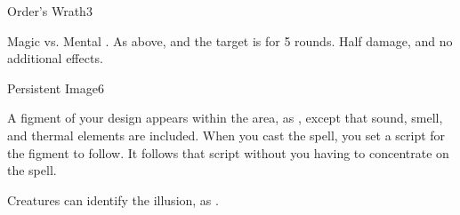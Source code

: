 
\begin{spellsection}{Order's Wrath}{3}
    \begin{spellheader}
    \end{spellheader}
    \begin{spellcontent}
        \begin{spelltargetinginfo}
        \end{spelltargetinginfo}
        \begin{spelleffects}
            \begin{spellattack}{Magic vs. Mental}
                \spellsuccess {}.
                \spellcritical As above, and the target is \immobilized for 5 rounds.
                \spellfailure Half damage, and no additional effects.
            \end{spellattack}
        \end{spelleffects}
    \end{spellcontent}
    \begin{spellfooter}
        \miscastrandom
    \end{spellfooter}
\end{spellsection}

\begin{spellsection}{Persistent Image}{6}
    \begin{spellheader}
    \end{spellheader}
    \begin{spellcontent}
        \begin{spelltargetinginfo}
        \end{spelltargetinginfo}
        \begin{spelleffects}
            \spelleffect A figment of your design appears within the area, as , except that sound, smell, and thermal elements are included. When you cast the spell, you set a script for the figment to follow. It follows that script without you having to concentrate on the spell.
            \spelldur \durmed \dismissable
        \end{spelleffects}
    \end{spellcontent}
    \begin{spellfooter}
        \spellnotes Creatures can identify the illusion, as .
        \miscastexplode
    \end{spellfooter}
\end{spellsection}

